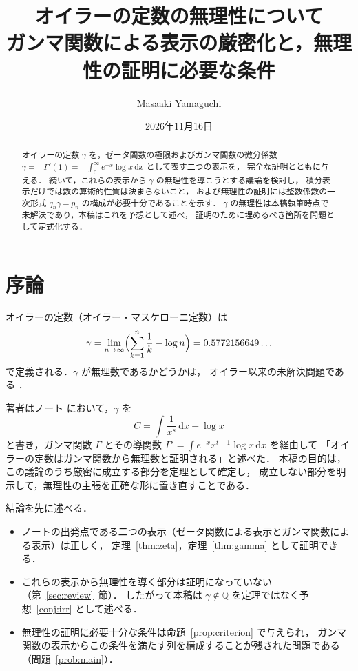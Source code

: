 \documentclass[a4paper,11pt]{ltjsarticle}
\title{オイラーの定数の無理性について\\
{\large ガンマ関数による表示の厳密化と，無理性の証明に必要な条件}}
\author{Masaaki Yamaguchi}
\date{2026年11月16日}
\theoremstyle{plain}
\theoremstyle{definition}
\newcommand{\Q}{\mathbb{Q}}
\newcommand{\dd}{\,\mathrm{d}}
\begin{document}
\maketitle

\begin{abstract}
オイラーの定数 $\gamma$ を，ゼータ関数の極限およびガンマ関数の微分係数
$\gamma=-\Gamma'(1)=-\int_0^\infty e^{-x}\log x\dd x$ として表す二つの表示を，
完全な証明とともに与える．
続いて，これらの表示から $\gamma$ の無理性を導こうとする議論を検討し，
積分表示だけでは数の算術的性質は決まらないこと，
および無理性の証明には整数係数の一次形式 $q_n\gamma-p_n$ の構成が必要十分であることを示す．
$\gamma$ の無理性は本稿執筆時点で未解決であり，本稿はこれを予想として述べ，
証明のために埋めるべき箇所を問題として定式化する．
\end{abstract}

\section{序論}

オイラーの定数（オイラー・マスケローニ定数）は
\[
  \gamma=\lim_{n\to\infty}\Bigl(\sum_{k=1}^{n}\frac1k-\log n\Bigr)=0.5772156649\ldots
\]
で定義される．$\gamma$ が無理数であるかどうかは，
オイラー以来の未解決問題である \cite{Lagarias}．

著者はノート \cite{Note} において，$\gamma$ を
\[
  C=\int\frac{1}{x^{s}}\dd x-\log x
\]
と書き，ガンマ関数 $\Gamma$ とその導関数
$\Gamma'=\int e^{-x}x^{t-1}\log x\dd x$ を経由して
「オイラーの定数はガンマ関数から無理数と証明される」と述べた．
本稿の目的は，この議論のうち厳密に成立する部分を定理として確定し，
成立しない部分を明示して，無理性の主張を正確な形に置き直すことである．

結論を先に述べる．
\begin{itemize}
  \item ノートの出発点である二つの表示（ゼータ関数による表示とガンマ関数による表示）は正しく，
        定理~\ref{thm:zeta}，定理~\ref{thm:gamma} として証明できる．
  \item これらの表示から無理性を導く部分は証明になっていない（第~\ref{sec:review}~節）．
        したがって本稿は $\gamma\notin\Q$ を定理ではなく予想~\ref{conj:irr} として述べる．
  \item 無理性の証明に必要十分な条件は命題~\ref{prop:criterion} で与えられ，
        ガンマ関数の表示からこの条件を満たす列を構成することが残された問題である
        （問題~\ref{prob:main}）．
\end{itemize}
\end{document}
